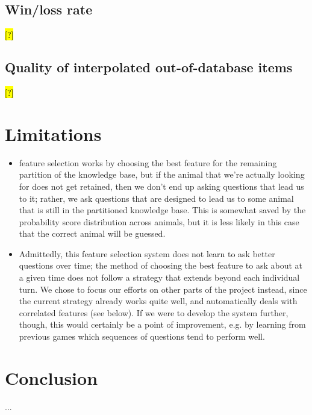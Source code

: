 \documentclass[11pt,a4paper]{article}
\begin{document}
\subsection{Win/loss rate}

\hl{[?]}

\subsection{Quality of interpolated out-of-database items}

\hl{[?]}

\section{Limitations}
\label{sec:limit}

\begin{itemize}
\item feature selection works by choosing the best feature for the remaining partition of the knowledge base, but if the animal that we're actually looking for does not get retained, then we don't end up asking questions that lead us to it; rather, we ask questions that are designed to lead us to some animal that is still in the partitioned knowledge base. This is somewhat saved by the probability score distribution across animals, but it is less likely in this case that the correct animal will be guessed.
\item Admittedly, this feature selection system does not learn to ask better questions over time; the method of choosing the best feature to ask about at a given time does not follow a strategy that extends beyond each individual turn.
We chose to focus our efforts on other parts of the project instead, since the current strategy already works quite well, and automatically deals with correlated features (see below).
If we were to develop the system further, though, this would certainly be a point of improvement, e.g. by learning from previous games which sequences of questions tend to perform well.
\end{itemize}

\section{Conclusion}
\label{sec:concl}

...




\appendix
\end{document}
